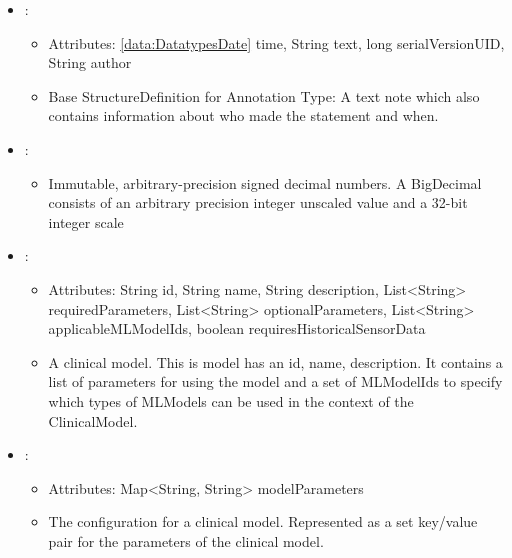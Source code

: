 \begin{itemize}[nolistsep,noitemsep]
\item {}: 
\begin{itemize}[noitemsep,nolistsep]
\item[] Attributes: \ref{data:DatatypesDate} time, String text, long serialVersionUID, String author
\item[] Base StructureDefinition for Annotation Type: A  text note which also  contains information about who made the statement and when.
\end{itemize}

\item {}: 
\begin{itemize}[noitemsep,nolistsep]

\item[] Immutable, arbitrary-precision signed decimal numbers. A BigDecimal consists of an arbitrary precision integer unscaled value and a 32-bit integer scale
\end{itemize}

\item {}: 
\begin{itemize}[noitemsep,nolistsep]
\item[] Attributes: String id, String name, String description, List\textless{}String\textgreater{} requiredParameters, List\textless{}String\textgreater{} optionalParameters, List\textless{}String\textgreater{} applicableMLModelIds, boolean requiresHistoricalSensorData
\item[] A clinical model. This is model has an id, name, description.
It contains a list of  parameters for using the model and a set of MLModelIds to specify which types of MLModels can be used in the context of the ClinicalModel.

\end{itemize}

\item {}: 
\begin{itemize}[noitemsep,nolistsep]
\item[] Attributes: Map\textless{}String, String\textgreater{} modelParameters
\item[] The configuration for a clinical model. Represented as a set key/value pair for the parameters of the clinical model.
\end{itemize}


\end{itemize}
